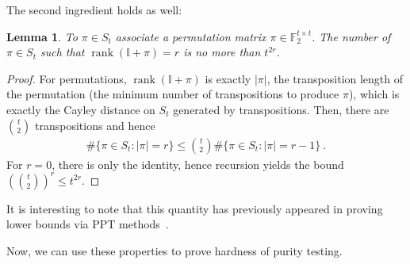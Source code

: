 \documentclass[11pt]{article}
\newtheorem{lemma}[theorem]{Lemma}
\newcommand{\id}{\ensuremath{\mathbb{I}}}
\newcommand{\F}{\mathbb{F}}
\DeclareMathOperator{\rank}{rank}
\begin{document}
The second ingredient holds as well:
\begin{lemma}\label{lem:sn_counting}
        To $\pi \in S_t$ associate a permutation matrix $\pi \in \F_2^{t \times t}$. The number of $\pi \in S_t$ such that $\rank(\id+\pi)=r$ is no more than $t^{2r}$.
    \end{lemma}
    \begin{proof}
        For permutations, $\rank(\id+\pi)$ is exactly $\vert \pi \vert$, the transposition length of the permutation (the minimum number of transpositions to produce $\pi$), which is exactly the Cayley distance on $S_t$ generated by transpositions. Then, there are $\binom{t}{2}$ transpositions and hence
        \begin{align}
            \#\{\pi\in S_t : \vert \pi \vert = r\} \leq \binom{t}{2}\#\{\pi\in S_t : \vert \pi \vert = r-1\}\ .
        \end{align}
        For $r=0$, there is only the identity, hence recursion yields the bound $\left( \binom{t}{2} \right)^r \leq t^{2r}$.
    \end{proof}
It is interesting to note that this quantity has previously appeared in proving lower bounds via PPT methods~\cite{harrow2023approximate}.

Now, we can use these properties to prove hardness of purity testing.
\end{document}
